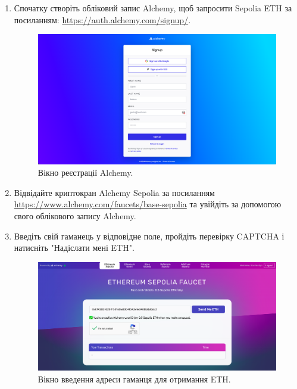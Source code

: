 \begin{enumerate}
    \item Спочатку створіть обліковий запис Alchemy, щоб запросити Sepolia ETH за посиланням: \href{https://auth.alchemy.com/signup?redirectUrl=https%3A%2F%2Fdashboard.alchemy.com%2Fsignup%3Fa%3Dsepolia_faucet%26redirectUrl%3Dhttps%253A%252F%252Fsepoliafaucet.com%252F%253FauthRefresh%253DTrue}{https://auth.alchemy.com/signup/}.
    
    \begin{figure}[ht]
            \centering
            \includegraphics[scale=0.25]{IMAGES/metamask11.png}
            \caption{Вікно реєстрації Alchemy.}
            \label{fig_pacman}
    \end{figure}

    \item Відвідайте криптокран Alchemy Sepolia за посиланням \url{https://www.alchemy.com/faucets/base-sepolia} та увійдіть за допомогою свого облікового запису Alchemy.

    \item Введіть свій гаманець у відповідне поле, пройдіть перевірку CAPTCHA і натисніть "Надіслати мені ETH".

    \begin{figure}[ht]
            \centering
            \includegraphics[scale=0.3]{IMAGES/metamask12.png}
            \caption{Вікно введення адреси гаманця для отримання ETH.}
            \label{fig_pacman}
    \end{figure}


\end{enumerate}
